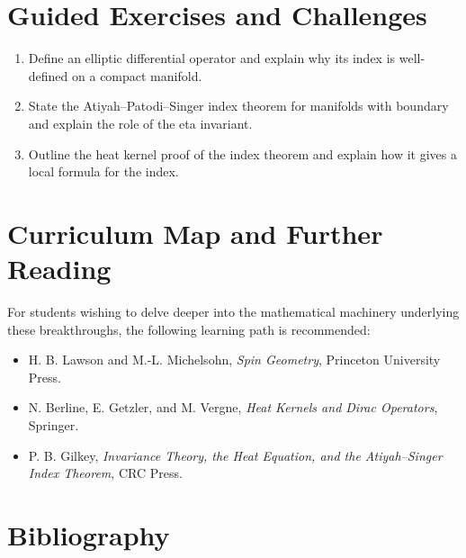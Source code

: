 \section{Guided Exercises and Challenges}
\begin{enumerate}[label=\textbf{\arabic*.}]
  \item Define an elliptic differential operator and explain why its index is well-defined on a compact manifold.
  \item State the Atiyah--Patodi--Singer index theorem for manifolds with boundary and explain the role of the eta invariant.
  \item Outline the heat kernel proof of the index theorem and explain how it gives a local formula for the index.
\end{enumerate}

\section{Curriculum Map and Further Reading}
For students wishing to delve deeper into the mathematical machinery underlying these breakthroughs, the following learning path is recommended:
\begin{itemize}
  \item H. B. Lawson and M.-L. Michelsohn, \emph{Spin Geometry}, Princeton University Press.
  \item N. Berline, E. Getzler, and M. Vergne, \emph{Heat Kernels and Dirac Operators}, Springer.
  \item P. B. Gilkey, \emph{Invariance Theory, the Heat Equation, and the Atiyah--Singer Index Theorem}, CRC Press.
\end{itemize}

\section*{Bibliography}

